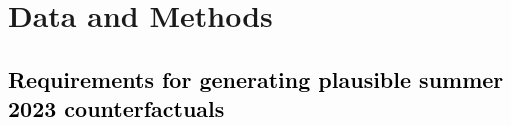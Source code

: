 \documentclass[draft]{agujournal2019}
\renewcommand{\st}[1]{\unskip}
\newcommand{\newTxt}{\textcolor{black}}
\begin{document}


\section{Data and Methods}
\label{sec:DataMethods}

\subsection{\newTxt{Requirements for generating plausible  summer 2023 counterfactuals}} \label{subsec:requirements}
\end{document}

